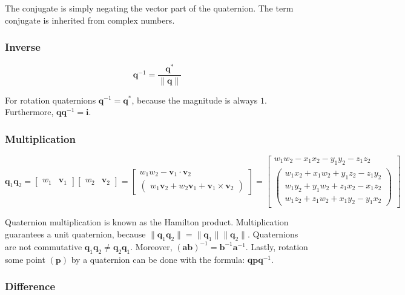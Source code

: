 \documentclass[a4paper,11pt]{article}
\begin{document}
The conjugate is simply negating the vector part of the quaternion. The term conjugate is inherited from complex numbers.

\subsubsection{Inverse}

$$\textbf{q}^{-1}=\frac{\textbf{q}^*}{\|\textbf{q}\|}$$

For rotation quaternions $\textbf{q}^{-1}=\textbf{q}^*$, because the magnitude is always $1$. Furthermore, $\textbf{q}\textbf{q}^{-1}=\textbf{i}$.

\subsubsection{Multiplication}

$$
\textbf{q}_1\textbf{q}_2=\begin{bmatrix}
	w_1 & \textbf{v}_1
\end{bmatrix}\begin{bmatrix}
	w_2 & \textbf{v}_2
\end{bmatrix}=\begin{bmatrix}
	w_1w_2-\textbf{v}_1\cdot\textbf{v}_2 \\
	\begin{pmatrix}
		w_1\textbf{v}_2 + w_2\textbf{v}_1 + \textbf{v}_1\times\textbf{v}_2
	\end{pmatrix}
\end{bmatrix}
=\begin{bmatrix}
	w_1w_2-x_1x_2-y_1y_2-z_1z_2 \\
	\begin{pmatrix}
		w_1x_2 + x_1w_2 + y_1z_2 - z_1y_2 \\
		w_1y_2 + y_1w_2 + z_1x_2 - x_1z_2 \\
		w_1z_2 + z_1w_2 + x_1y_2 - y_1x_2
	\end{pmatrix}
\end{bmatrix}
$$

Quaternion multiplication is known as the Hamilton product. Multiplication guarantees a unit quaternion, because $\|\textbf{q}_1\textbf{q}_2\|=\|\textbf{q}_1\|\|\textbf{q}_2\|$. Quaternions are not commutative $\textbf{q}_1\textbf{q}_2\neq\textbf{q}_2\textbf{q}_1$. Moreover, $(\textbf{ab})^{-1}=\textbf{b}^{-1}\textbf{a}^{-1}$. Lastly, rotation some point $(\textbf{p})$ by a quaternion can be done with the formula: $\textbf{qp}\textbf{q}^{-1}$.

\subsubsection{Difference}
\end{document}
